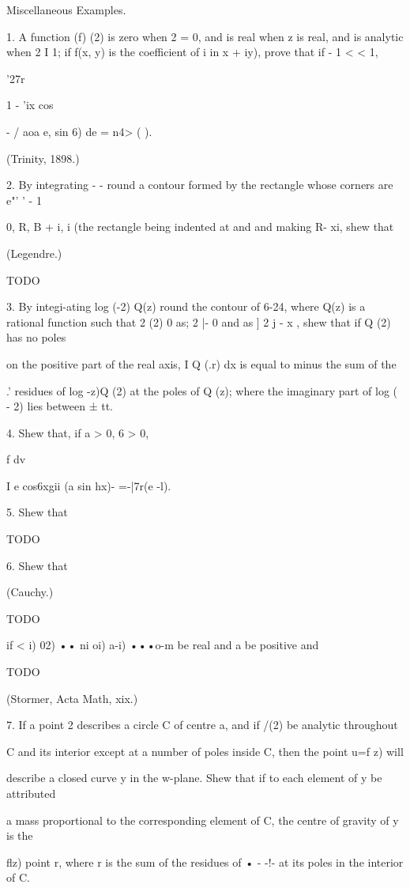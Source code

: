 %
%

Miscellaneous Examples.

1. A function (f) (2) is zero when 2 = 0, and is real when z is real,
and is analytic when 2 I 1; if f(x, y) is the coefficient of i in x +
iy), prove that if - 1 < < 1,

'27r

1 - 'ix cos

  - / aoa e, sin 6) de = n4> ( ).

(Trinity, 1898.)

2. By integrating - - round a contour formed by the rectangle whose
corners are e"' ' - 1

0, R, B + i, i (the rectangle being indented at and and making R- xi,
shew that

(Legendre.)

TODO

3. By integi-ating log (-2) Q(z) round the contour of 6-24, where Q(z)
is a rational function such that 2 (2) 0 as; 2 |- 0 and as ] 2 j - x
, shew that if Q (2) has no poles

on the positive part of the real axis, I Q (.r) dx is equal to minus
the sum of the

.' residues of log -z)Q (2) at the poles of Q (z); where the
imaginary part of log ( - 2) lies between ± tt.

4. Shew that, if a > 0, 6 > 0,

f dv

I e cos6xgii (a sin hx)- =-|7r(e -l).

5. Shew that

TODO

6. Shew that

(Cauchy.)

TODO

if < i) 02) •• ni oi) a-i) •••o-m be real and a be positive and

TODO

(Stormer, Acta Math, xix.)

7. If a point 2 describes a circle C of centre a, and if /(2) be
analytic throughout

C and its interior except at a number of poles inside C, then the
point u=f z) will

describe a closed curve y in the w-plane. Shew that if to each element
of y be attributed

a mass proportional to the corresponding element of C, the centre of
gravity of y is the

flz) point r, where r is the sum of the residues of • - -!- at its
poles in the interior of C.

